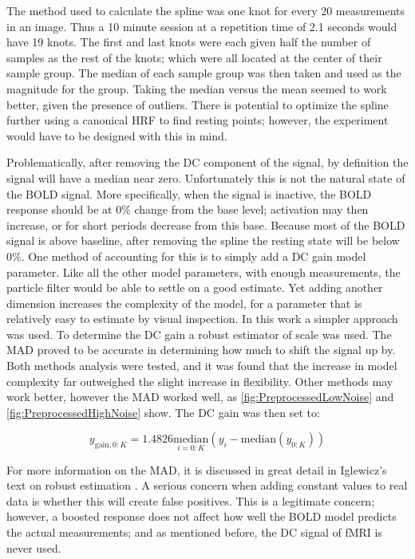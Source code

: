The method used to calculate the spline was one knot for every 20
measurements in an image. Thus a 10 minute session at a repetition time of
2.1 seconds would have 19 knots. The first and last knots were each
given half the number of samples as the rest of the knots; which were all
located at the center of their sample group. The median of each sample group
was then taken and used as the magnitude for the group. Taking the median
versus the mean seemed to work better, given the presence of outliers.
There is potential to optimize the spline further using a canonical
HRF to find resting points; however, the experiment would have
to be designed with this in mind.

Problematically, after removing the DC component of the signal,
by definition the signal will have a median near zero.
Unfortunately this is not the natural state of the \ac{BOLD} signal. More specifically,
when the signal is inactive, the \ac{BOLD} response should be at 0\% change from
the base level; activation may then increase, or for short periods decrease from this base.
Because most of the \ac{BOLD} signal is above baseline, after removing the spline
the resting state will be below 0\%.
One method of accounting for this is to simply add a DC gain model parameter.
Like all the other model parameters, with enough measurements, the particle filter
would be able to settle on a good estimate. Yet adding another dimension increases the
complexity of the model, for a parameter that is relatively easy to estimate
by visual inspection.  In this work a simpler approach was used. To determine
the DC gain a robust estimator of scale was used. The 
\ac{MAD} proved to be accurate in determining how much to shift the signal up
by. Both methods analysis were tested, and it was found that the increase
in model complexity far outweighed the slight increase in flexibility. Other
methods may work better, however the \ac{MAD} worked well,
as \autoref{fig:PreprocessedLowNoise} and 
\autoref{fig:PreprocessedHighNoise} show. The \ac{DC} gain was then set to:

\begin{equation}
y_{\text{gain}, 0:K} = 1.4826\underset{i=0:K}{\text{median}}(y_i - \text{median}(y_{0:K}))
\label{eq:mad}
\end{equation}

For more information on the \ac{MAD}, it is discussed in great detail in
Iglewicz's text on robust estimation \cite{iglewicz1983robust}.
A serious concern when adding constant values to
real data is whether this will create false positives. This is a legitimate
concern; however, a boosted response does not affect how well the \ac{BOLD} model
predicts the actual measurements; and as mentioned before, the DC signal 
of \ac{fMRI} is never used.

